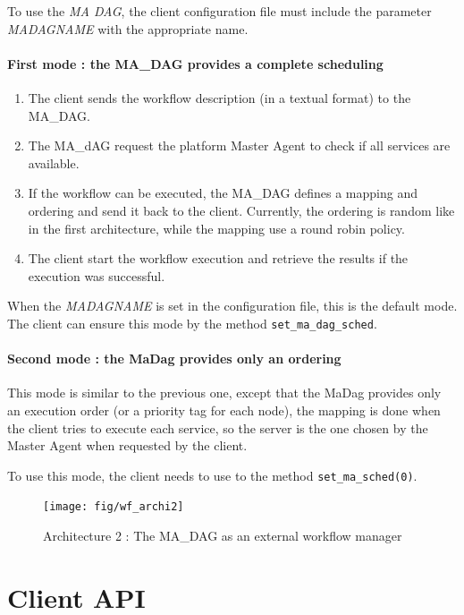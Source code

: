 To use the \textit{MA DAG}, the client configuration file must include
the parameter \textit{MADAGNAME} with the appropriate name.

\paragraph{First mode : the MA\_DAG provides a complete scheduling}

\begin{enumerate}
\item The client sends the workflow description (in a textual format)
  to the MA\_DAG.
\item The MA\_dAG request the platform Master Agent to check if all
  services are available.
\item If the workflow can be executed, the MA\_DAG defines a mapping and
  ordering and send it back to the client. Currently, the ordering is
  random like in the first architecture, while the mapping use a round
  robin policy.
\item The client start the workflow execution and retrieve the results
  if the execution was successful.
\end{enumerate}

When the \textit{MADAGNAME} is set in the configuration file, this is
the default mode. The client can ensure this mode by the method
\texttt{set\_ma\_dag\_sched}. 

\paragraph{Second mode : the MaDag provides only an ordering}

This mode is similar to the previous one, except that the MaDag
provides only an execution order (or a priority tag for each node),
the mapping is done when the client tries to execute each service, so
the server is the one chosen by the Master Agent when requested by the
client.

To use this mode, the client needs to use to the method
\texttt{set\_ma\dag\_sched(0)}. 

\begin{figure}[htbp]
  \centering
  \texttt{[image: fig/wf\_archi2]}
  \caption{Architecture 2 : The MA\_DAG as an external workflow manager}
  \label{fig:archi2}
\end{figure}




\section{Client API}


